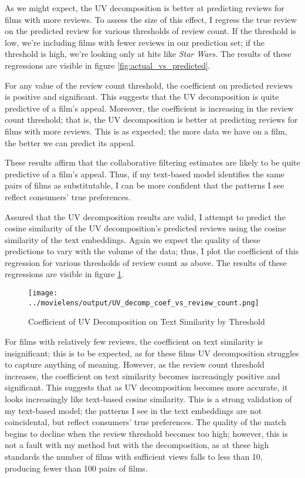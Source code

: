 \documentclass{article}
\begin{document}
As we might expect, the UV decomposition is better at predicting reviews for films with more reviews. To assess the size of this effect, I regress the true review on the predicted review for various thresholds of review count. If the threshold is low, we're including films with fewer reviews in our prediction set; if the threshold is high, we're looking only at hits like \emph{Star Wars.} The results of these regressions are visible in figure \ref{fig:actual_vs_predicted}.

For any value of the review count threshold, the coefficient on predicted reviews is positive and significant. This suggests that the UV decomposition is quite predictive of a film's appeal. Moreover, the coefficient is increasing in the review count threshold; that is, the UV decomposition is better at predicting reviews for films with more reviews. This is as expected; the more data we have on a film, the better we can predict its appeal.

These results affirm that the collaborative filtering estimates are likely to be quite predictive of a film's appeal. Thus, if my text-based model identifies the same pairs of films as substitutable, I can be more confident that the patterns I see reflect consumers' true preferences. 

Assured that the UV decomposition results are valid, I attempt to predict the cosine similarity of the UV decomposition's predicted reviews using the cosine similarity of the text embeddings. Again we expect the quality of these predictions to vary with the volume of the data; thus, I plot the coefficient of this regression for various thresholds of review count as above. The results of these regressions are visible in figure \ref{fig:uv_threshold}.

\begin{figure}
    \begin{center}
    \texttt{[image: ../movielens/output/UV\_decomp\_coef\_vs\_review\_count.png]}
    \caption{Coefficient of UV Decomposition on Text Similarity by Threshold}
    \label{fig:uv_threshold}
    \end{center}
\end{figure}

For films with relatively few reviews, the coefficient on text similarity is insignificant; this is to be expected, as for these films UV decomposition struggles to capture anything of meaning. However, as the review count threshold increases, the coefficient on text similarity becomes increasingly positive and significant. This suggests that as UV decomposition becomes more accurate, it looks increasingly like text-based cosine similarity. This is a strong validation of my text-based model; the patterns I see in the text embeddings are not coincidental, but reflect consumers' true preferences. The quality of the match begins to decline when the review threshold becomes too high; however, this is not a fault with my method but with the decomposition, as at these high standards the number of films with sufficient views falls to less than 10, producing fewer than 100 pairs of films. 
\end{document}
